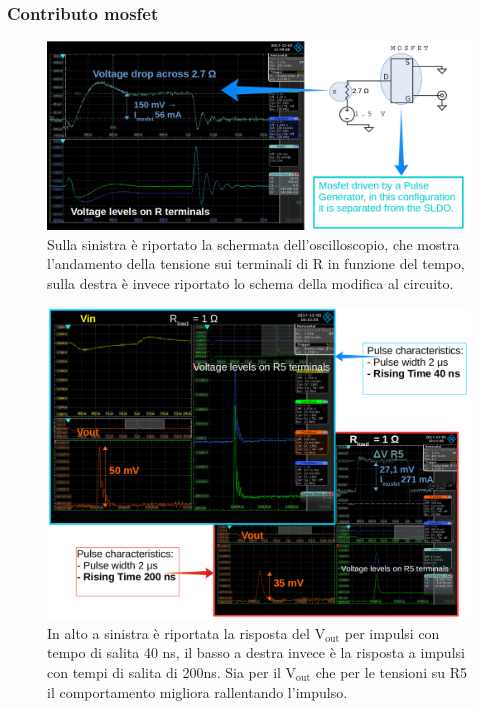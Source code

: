 \subsubsection{Contributo mosfet}
\begin{figure}
\centering
\includegraphics[width=\linewidth]{Immagini/MosfetBehaviourbis}
\caption{Sulla sinistra è riportato la schermata dell'oscilloscopio, che mostra l'andamento della tensione sui terminali di R in funzione del tempo, sulla destra è invece riportato lo schema della modifica al circuito.}
\label{MosfetBehaviour}
\end{figure}

\begin{figure}
\centering
\includegraphics[width=\linewidth]{Immagini/RiseTime}
\caption{In alto a sinistra è riportata la risposta del $\mathrm{V_{out}}$ per impulsi con tempo di salita 40 ns, il basso a destra invece è la risposta a impulsi con tempi di salita di 200ns. Sia per il $\mathrm{V_{out}}$ che per le tensioni su R5 il comportamento migliora rallentando l'impulso.}
\label{RiseTime}
\end{figure}

